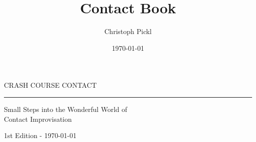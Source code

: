 \documentclass[a5paper,11pt]{book}
\title{Contact Book}
\date{\today}
\author{Christoph Pickl}
\begin{document}
\begin{titlepage}
\begin{center}
	
	\vspace*{\fill}
	
	\fontsize{22}{0}\selectfont
    {\sffamily CRASH COURSE CONTACT}
	\vskip 5mm
	\rule{84mm}{0.4pt}
	\vskip 1mm
	\fontsize{15}{22}\selectfont
	{\sffamily Small Steps into the Wonderful World of \\ Contact Improvisation}
	
	\vskip 70mm
	
	\vspace*{\fill}

	\fontsize{9}{0}\selectfont
	{\sffamily 1st Edition - \today}
\end{center}
\end{titlepage}

\pagestyle{empty}
\tableofcontents
\clearpage
\ifodd\value{page}\else
  \thispagestyle{empty}
\fi

\pagestyle{fancy}

















\printglossaries
\end{document}
